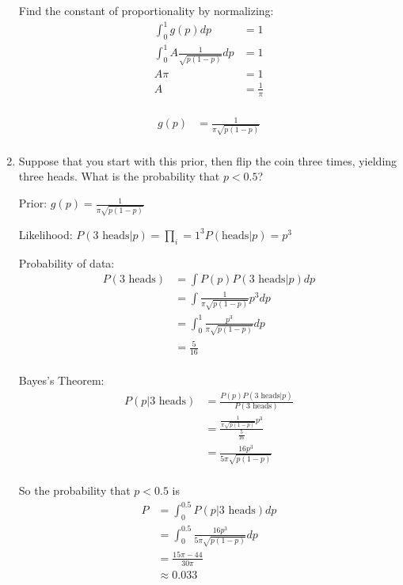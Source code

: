 \begin{enumerate}[label=\textbf{\Alph*}.]
    Find the constant of proportionality by normalizing:
    \begin{align*}
        \int_0^1 g(p)dp &= 1 \\
        \int_0^1 A \frac{1}{\sqrt{p(1-p)}} dp &= 1 \\
        A \pi &= 1 \\
        A &= \frac{1}{\pi} \\
    \end{align*}

    \begin{align*}
        g(p) &= \frac{1}{\pi\sqrt{p(1-p)}} \\
    \end{align*}

    \item Suppose that you start with this prior, then flip the coin three times, yielding three heads. What is the probability that $p<0.5$?
    
    Prior: $g(p) = \frac{1}{\pi\sqrt{p(1-p)}}$

    Likelihood: $P(\text{3 heads}|p) = \prod_i=1^3 P(\text{heads}|p) = p^3$

    Probability of data:
    \begin{align*}
        P(\text{3 heads}) &= \int P(p) P(\text{3 heads}|p) dp \\
        &= \int \frac{1}{\pi\sqrt{p(1-p)}} p^3 dp \\
        &= \int_0^1 \frac{p^3}{\pi\sqrt{p(1-p)}} dp \\
        &= \frac{5}{16} \\
    \end{align*}

    Bayes's Theorem:
    \begin{align*}
        P(p|\text{3 heads}) &= \frac{P(p)P(\text{3 heads}|p)}{P(\text{3 heads})} \\
        &= \frac{\frac{1}{\pi\sqrt{p(1-p)}} p^3 }{\frac{5}{16}} \\
        &= \frac{16p^3}{5\pi\sqrt{p(1-p)}} \\
    \end{align*}

    So the probability that $p<0.5$ is
    \begin{align*}
        P &= \int_0^{0.5} P(p|\text{3 heads}) dp \\
        &= \int_0^{0.5} \frac{16p^3}{5\pi\sqrt{p(1-p)}} dp \\
        &= \frac{15\pi - 44}{30\pi} \\
        &\approx 0.033 \\
    \end{align*}


\end{enumerate}
